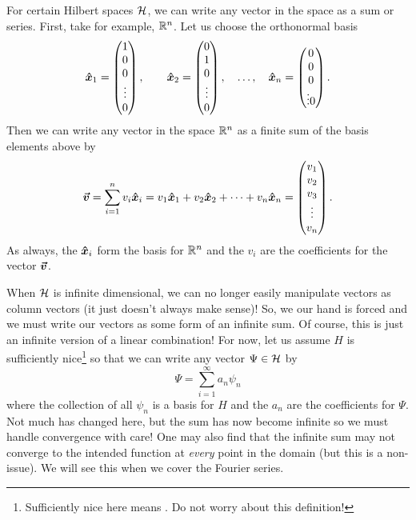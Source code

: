 For certain Hilbert spaces $\mathcal{H}$, we can write any vector in the space as a sum or series.  First, take for example, $\mathbb{R}^n$. Let us choose the orthonormal basis
\[
\boldsymbol{\hat{x}}_1 = \begin{pmatrix} 1 \\ 0 \\ 0 \\ \vdots \\ 0 \end{pmatrix}, \qquad \boldsymbol{\hat{x}}_2 = \begin{pmatrix} 0 \\ 1 \\ 0 \\ \vdots \\ 0 \end{pmatrix},\quad \dots, \quad \boldsymbol{\hat{x}}_n = \begin{pmatrix} 0 \\ 0 \\ 0 \\ \vdots 0 \end{pmatrix}.
\]
Then we can write any vector in the space $\mathbb{R}^n$ as a finite sum of the basis elements above by
\[
\boldsymbol{\boldsymbol{\vec{v}}} = \sum_{i=1}^n v_i \boldsymbol{\hat{x}}_i = v_1 \boldsymbol{\hat{x}}_1 + v_2 \boldsymbol{\hat{x}}_2 + \cdots + v_n \boldsymbol{\hat{x}}_n = \begin{pmatrix} v_1 \\ v_2 \\ v_3 \\ \vdots \\ v_n \end{pmatrix}.
\]
As always, the $\boldsymbol{\hat{x}}_i$ form the basis for $\mathbb{R}^n$ and the $v_i$ are the coefficients for the vector $\boldsymbol{\boldsymbol{\vec{v}}}$.

When $\mathcal{H}$ is infinite dimensional, we can no longer easily manipulate vectors as column vectors (it just doesn't always make sense)! So, we our hand is forced and we must write our vectors as some form of an infinite sum.  Of course, this is just an infinite version of a linear combination! For now, let us assume $H$ is sufficiently nice\footnote{Sufficiently nice here means . Do not worry about this definition!} so that we can write any vector $\Psi\in \mathcal{H}$ by
\[
\Psi = \sum_{i=1}^\infty a_n \psi_n
\]
where the collection of all $\psi_n$ is a basis for $H$ and the $a_n$ are the coefficients for $\Psi$.  Not much has changed here, but the sum has now become infinite so we must handle convergence with care! One may also find that the infinite sum may not converge to the intended function at \emph{every} point in the domain (but this is a non-issue). We will see this when we cover the Fourier series.

